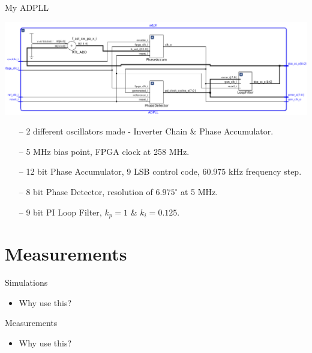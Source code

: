 \documentclass{beamer}
\begin{document}
\begin{frame}{My ADPLL}
 	\begin{center}
 		\includegraphics[scale=0.25]{../ADPLL_RTL_VIVADO}
 	\end{center}
		
	\begin{itemize}
		\item[--]
			2 different oscillators made - Inverter Chain \& Phase Accumulator.
		\item[--]
			5 MHz bias point, FPGA clock at 258 MHz.
		\item[--]
			12 bit Phase Accumulator, 9 LSB control code, $60.975$ kHz frequency step.
		\item[--]
			8 bit Phase Detector, resolution of $6.975^\circ$ at 5 MHz.
		\item[--]
			9 bit PI Loop Filter, $k_p=1$ \& $k_i=0.125$. %
	\end{itemize}
\end{frame}

\section*{Measurements}
\begin{frame}{Simulations}

\begin{itemize}
	\item
	Why use this?
\end{itemize}

\end{frame}

\begin{frame}{Measurements}

    \begin{itemize}
        \item
            Why use this?
    \end{itemize}
 
\end{frame}
\end{document}
